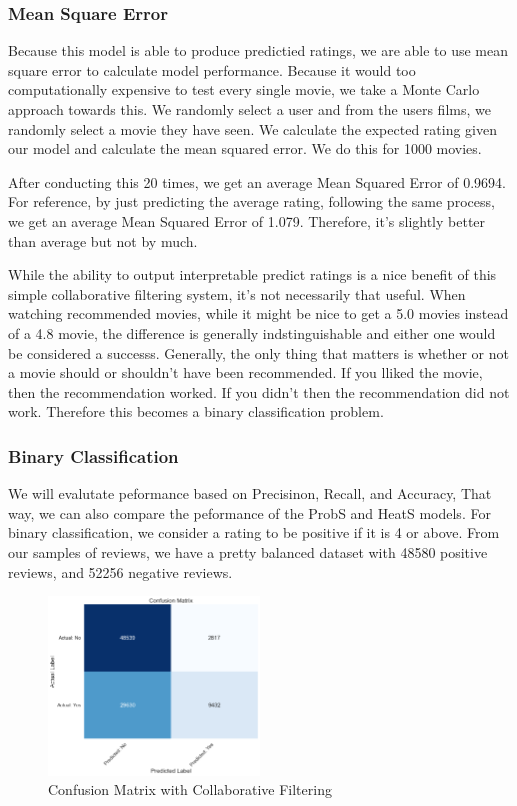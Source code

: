 \documentclass[12pt]{article}
\numberwithin{equation}{section}
\begin{document}
\subsubsection{Mean Square Error}
Because this model is able to produce predictied ratings, we are able to use mean square error to calculate model performance.  Because it would too computationally expensive to test every single movie, we take a Monte Carlo approach towards this. We randomly select a user and from the users films, we randomly select a movie they have seen. We calculate the expected rating given our model and calculate the mean squared error. We do this for 1000 movies.

After conducting this 20 times, we get an average Mean Squared Error of 0.9694. For reference, by just predicting the average rating, following the same process, we get an average Mean Squared Error of 1.079. Therefore, it's slightly better than average but not by much.

While the ability to output interpretable predict ratings is a nice benefit of this simple collaborative filtering system, it's not necessarily that useful. When watching recommended movies, while it might be nice to get a 5.0 movies instead of a 4.8 movie, the difference is generally indstinguishable and either one would be considered a successs. Generally, the only thing that matters is whether or not a movie should or shouldn't have been recommended. If you lliked the movie, then the recommendation worked. If you didn't then the recommendation did not work. Therefore this becomes a binary classification problem.

\subsubsection{Binary Classification}

We will evalutate peformance based on Precisinon, Recall, and Accuracy, That way, we can also compare the peformance of the ProbS and HeatS models. For binary classification, we consider a rating to be positive if it is 4 or above. From our samples of reviews, we have a pretty balanced dataset with 48580 positive reviews, and 52256 negative reviews.

\begin{figure}[t]
  \centering
  \includegraphics[width=0.5\textwidth]{conf_mat.png}
  \caption{Confusion Matrix with Collaborative Filtering}
  \label{fig:UN_degreeinfo}
\end{figure}
\end{document}

